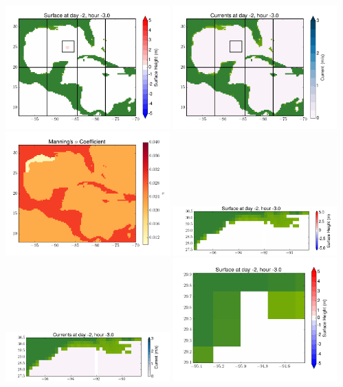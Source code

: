 \documentclass[11pt]{article}
\begin{document}
\vskip 10pt 
\includegraphics[width=0.475\textwidth]{frame0021fig1.png}
\includegraphics[width=0.475\textwidth]{frame0021fig2.png}
\vskip 10pt 
\includegraphics[width=0.475\textwidth]{frame0021fig3.png}
\includegraphics[width=0.475\textwidth]{frame0021fig4.png}
\vskip 10pt 
\includegraphics[width=0.475\textwidth]{frame0021fig5.png}
\includegraphics[width=0.475\textwidth]{frame0021fig6.png}
\end{document}
